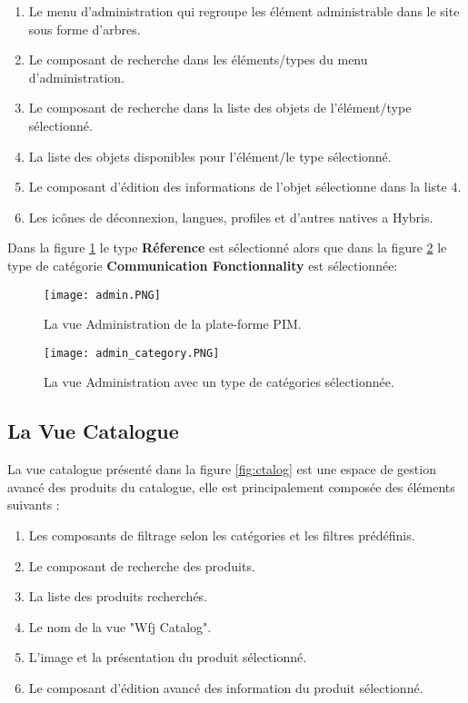 \begin{enumerate}
    \item Le menu d'administration qui regroupe les élément administrable dans le site sous forme d'arbres.
    \medskip
    \item Le composant de recherche dans les éléments/types du menu d'administration.
    \medskip
    \item Le composant de recherche dans la liste des objets de l'élément/type sélectionné.
    \medskip
    \item La liste des objets disponibles pour l'élément/le type sélectionné.
    \medskip
    \item Le composant d'édition des informations de l'objet sélectionne dans la liste 4.
    \medskip
    \item Les icônes de déconnexion, langues, profiles et d'autres natives a Hybris. 
\end{enumerate}

Dans la figure \ref{fig:admin} le type \textbf{Réference} est sélectionné alors que dans la figure \ref{fig:admin-category} le type de catégorie \textbf{Communication Fonctionnality} est sélectionnée: 


\begin{figure}[ht]
  \centering
  \texttt{[image: admin.PNG]}
  \caption{La vue Administration de la plate-forme PIM.}
  \label{fig:admin}
\end{figure}
\FloatBarrier

\begin{figure}[ht]
  \centering
  \texttt{[image: admin\_category.PNG]}
  \caption{La vue Administration avec un type de catégories sélectionnée.}
  \label{fig:admin-category}
\end{figure}
\FloatBarrier

\subsection{La Vue Catalogue}

La vue catalogue présenté dans la figure \ref{fig:ctalog} est une espace de gestion avancé des produits du catalogue, elle est principalement composée des éléments suivants :

\begin{enumerate}
    \item Les composants de filtrage selon les catégories et les filtres prédéfinis.
    \item Le composant de recherche des produits.
    \item La liste des produits recherchés.
    \item Le nom de la vue "Wfj Catalog".
    \item L'image et la présentation du produit sélectionné.
    \item Le composant d'édition avancé des information du produit sélectionné.
\end{enumerate}

